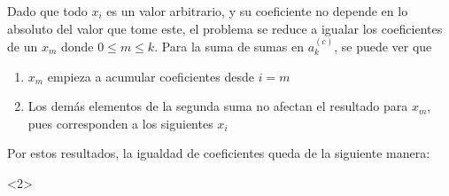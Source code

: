     \vspace{1cm}
    Dado que todo $x_i$ es un valor arbitrario, y su coeficiente no depende en lo absoluto
    del valor que tome este, el problema se reduce a igualar los coeficientes de un $x_m$
    donde $0 \leq m \leq k$.
    Para la suma de sumas en $a_k^{(c)}$, se puede ver que
    \begin{enumerate}[label=(\Roman*)]
        \item $x_m$ empieza a acumular coeficientes desde $i=m$
        \item Los demás elementos de la segunda suma no afectan el resultado para $x_m$, pues
        corresponden a los siguientes $x_i$
    \end{enumerate}
    Por estos resultados, la igualdad de coeficientes queda de la siguiente manera:
    \vspace{1cm}
        \begin{longderivation}<2>
                \\
            \\
                \\
            \why*{}\\
                \\
            \\
                \\
            \\
                \\
            \\
                \\
            \why*{}\\
                \\
            \why*{}\\
        \end{longderivation}

